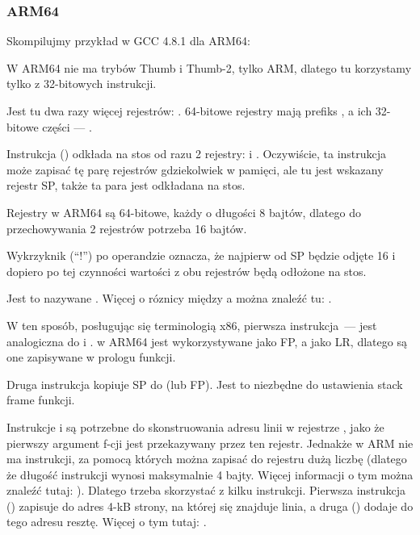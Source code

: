 \subsubsection{ARM64}


Skompilujmy przykład w GCC 4.8.1 dla ARM64:



W ARM64 nie ma trybów Thumb i Thumb-2, tylko ARM, dlatego tu korzystamy tylko z 32-bitowych instrukcji.

Jest tu dwa razy więcej rejestrów: .
64-bitowe rejestry mają prefiks 
, a ich 32-bitowe części --- .

Instrukcja  () 
odkłada na stos od razu 2 rejestry:  i .
Oczywiście, ta instrukcja może zapisać tę parę rejestrów gdziekolwiek w pamięci, ale tu jest wskazany rejestr \ac{SP}, także ta para jest odkładana na stos.

Rejestry w ARM64 są 64-bitowe, każdy o długości 8 bajtów, dlatego do przechowywania 2 rejestrów potrzeba 16 bajtów.

Wykrzyknik (``!'') po operandzie oznacza, że najpierw od \ac{SP} będzie odjęte 16 i dopiero po tej czynności wartości z obu rejestrów będą odłożone na stos.

Jest to nazywane .
Więcej o róznicy między  a  
można znaleźć tu: .

W ten sposób, posługując się terminologią x86, pierwsza instrukcja~--- jest analogiczna do  i .
 w ARM64 jest wykorzystywane jako \ac{FP}, a  
jako \ac{LR}, dlatego są one zapisywane w prologu funkcji.

Druga instrukcja kopiuje \ac{SP} do  (lub \ac{FP}).
Jest to niezbędne do ustawienia stack frame funkcji.

\label{pointers_ADRP_and_ADD}
Instrukcje  i \ADD są potrzebne do skonstruowania adresu linii  w rejestrze , 
jako że pierwszy argument f-cji jest przekazywany przez ten rejestr.
Jednakże w ARM nie ma instrukcji, za pomocą których można zapisać do rejestru dużą liczbę 
(dlatego że długość instrukcji wynosi maksymalnie 4 bajty. Więcej informacji o tym można znaleźć tutaj: ).
Dlatego trzeba skorzystać z kilku instrukcji.
Pierwsza instrukcja () zapisuje do  adres 4-kB strony, na której się znajduje linia, 
a druga (\ADD) dodaje do tego adresu resztę.
Więcej o tym tutaj: .

